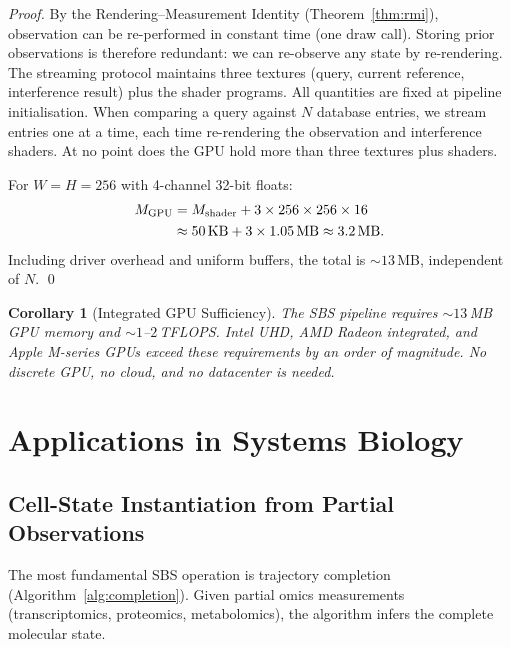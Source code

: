 \documentclass[11pt,twocolumn,a4paper]{article}
\newtheorem{corollary}[theorem]{Corollary}
\newcommand{\Mgpu}{M_{\mathrm{GPU}}}
\newcommand{\Mshader}{M_{\mathrm{shader}}}
\begin{document}
\begin{proof}
By the Rendering--Measurement Identity (Theorem~\ref{thm:rmi}),
observation can be re-performed in constant time (one draw call).
Storing prior observations is therefore redundant: we can re-observe
any state by re-rendering.  The streaming protocol maintains three
textures (query, current reference, interference result) plus the
shader programs.  All quantities are fixed at pipeline initialisation.
When comparing a query against $N$ database entries, we stream entries
one at a time, each time re-rendering the observation and interference
shaders.  At no point does the GPU hold more than three textures plus
shaders.

For $W = H = 256$ with 4-channel 32-bit floats:
\begin{align}
  \Mgpu &= \Mshader + 3 \times 256 \times 256 \times 16 \notag \\
        &\approx 50\,\text{KB} + 3 \times 1.05\,\text{MB}
        \approx 3.2\,\text{MB}.
  \label{eq:memory-calc}
\end{align}
Including driver overhead and uniform buffers, the total is
$\sim\!13$\,MB, independent of $N$.  \qed
\end{proof}

\begin{corollary}[Integrated GPU Sufficiency]
\label{cor:integrated-gpu}
The SBS pipeline requires $\sim\!13$\,MB GPU memory and
$\sim\!1$--$2$\,TFLOPS.  Intel UHD, AMD Radeon integrated, and Apple
M-series GPUs exceed these requirements by an order of magnitude.  No
discrete GPU, no cloud, and no datacenter is needed.
\end{corollary}



\section{Applications in Systems Biology}
\label{sec:applications}

\subsection{Cell-State Instantiation from Partial Observations}

The most fundamental SBS operation is trajectory completion
(Algorithm~\ref{alg:completion}).  Given partial omics measurements
(transcriptomics, proteomics, metabolomics), the algorithm infers the
complete molecular state.
\end{document}

